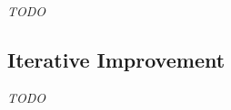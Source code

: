 \emph{TODO}

%


\subsection{Iterative Improvement}
\label{sec:iterative-improvement}

\emph{TODO}



